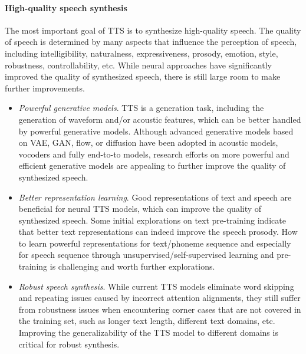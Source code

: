 \documentclass{article}
\begin{document}
\paragraph{High-quality speech synthesis} The most important goal of TTS is to synthesize high-quality speech. The quality of speech is determined by many aspects that influence the perception of speech, including intelligibility, naturalness, expressiveness, prosody, emotion, style, robustness, controllability, etc. While neural approaches have significantly improved the quality of synthesized speech, there is still large room to make further improvements. 
\begin{itemize}[leftmargin=*]
    \item \textit{Powerful generative models}. TTS is a generation task, including the generation of waveform and/or acoustic features, which can be better handled by powerful generative models. Although advanced generative models based on VAE, GAN, flow, or diffusion have been adopted in acoustic models, vocoders and fully end-to-to models, research efforts on more powerful and efficient generative models are appealing to further improve the quality of synthesized speech. 
    
    \item \textit{Better representation learning}. Good representations of text and speech are beneficial for neural TTS models, which can improve the quality of synthesized speech. Some initial explorations on text pre-training indicate that better text representations can indeed improve the speech prosody. How to learn powerful representations for text/phoneme sequence and especially for speech sequence through unsupervised/self-supervised learning and pre-training is challenging and worth further explorations. 
    
    \item \textit{Robust speech synthesis}. While current TTS models eliminate word skipping and repeating issues caused by incorrect attention alignments, they still suffer from robustness issues when encountering corner cases that are not covered in the training set, such as longer text length, different text domains, etc. Improving the generalizability of the TTS model to different domains is critical for robust synthesis. 
    

\end{itemize}
\end{document}
